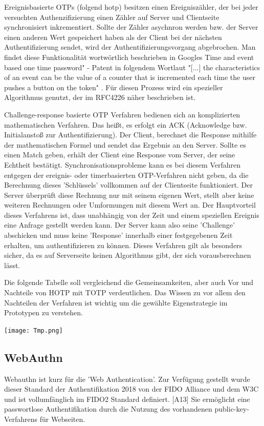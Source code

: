 Ereignisbasierte OTPs (folgend \ac{hotp}) besitzen einen Ereigniszähler, der bei jeder versuchten Authenzifizierung einen Zähler auf Server und Clientseite synchronisiert inkrementiert. Sollte der Zähler asychnron werden bzw. der Server einen anderen Wert gespeichert haben als der Client bei der nächsten Authentifizierung sendet, wird der Authentifizierungsvorgang abgebrochen. Man findet diese Funktionalität wortwörtlich beschrieben in Googles Time and event based one time password" - Patent \cite{A6} in folgendem Wortlaut "[...] the characteristics of an event can be the value of a counter that is incremented each time the user pushes a button on the token" \cite{A6}. Für diesen Prozess wird ein spezieller Algorithmus genutzt, der im RFC4226 näher beschrieben ist.

Challenge-response basierte OTP Verfahren bedienen sich an komplizierten mathematischen Verfahren. Das heißt, es erfolgt ein ACK (Acknowledge bzw. Initialanstoß zur Authentifizierung). Der Client, berechnet die Response mithilfe der mathematischen Formel und sendet das Ergebnis an den Server. Sollte es einen Match geben, erhält der Client eine Response vom Server, der seine Echtheit bestätigt. Synchronisationsprobleme kann es bei diesem Verfahren entgegen der ereignis- oder timerbasierten OTP-Verfahren nicht geben, da die Berechnung dieses 'Schlüssels' vollkommen auf der Clientseite funktioniert. Der Server überprüft diese Rechnung nur mit seinem eigenen Wert, stellt aber keine weiteren Rechnungen oder Umformungen mit diesem Wert an. Der Hauptvorteil dieses Verfahrens ist, dass unabhängig von der Zeit und einem speziellen Ereignis eine Anfrage gestellt werden kann. Der Server kann also seine 'Challenge' abschicken und muss keine 'Response' innerhalb einer festgegebenen Zeit erhalten, um authentifizieren zu können. Dieses Verfahren gilt als besonders sicher, da es auf Serverseite keinen Algorithmus gibt, der sich vorausberechnen lässt.

Die folgende Tabelle soll vergleichend die Gemeinsamkeiten, aber auch Vor und Nachteile von HOTP mit TOTP verdeutlichen. Das Wissen zu vor allem den Nachteilen der Verfahren ist wichtig um die gewählte Eigenstrategie im Prototypen zu verstehen.

\texttt{[image: Tmp.png]}

\subsection{WebAuthn}
Webauthn ist kurz für die 'Web Authentication'. Zur Verfügung gestellt wurde dieser Standard der Authentifikation 2018 von der FIDO Alliance und dem W3C und ist vollumfänglich im FIDO2 Standard definiert. [A13] Sie ermöglicht eine passwortlose Authentifikation durch die Nutzung des vorhandenen public-key-Verfahrens für Webseiten.

